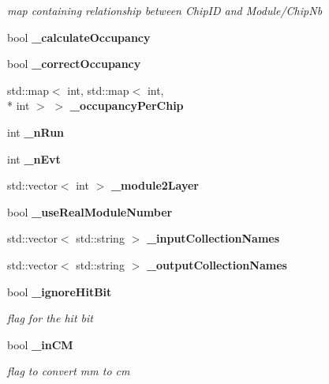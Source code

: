 \begin{DoxyCompactItemize}
\begin{DoxyCompactList}\small\item\em map containing relationship between Chip\-I\-D and Module/\-Chip\-Nb \end{DoxyCompactList}\item 
bool {\bfseries \-\_\-calculate\-Occupancy}\label{classCALICE_1_1Ahc2CalibrateProcessor_a8fc64538e07b1c5f42df362426007387}

\item 
bool {\bfseries \-\_\-correct\-Occupancy}\label{classCALICE_1_1Ahc2CalibrateProcessor_a62acc67ca6e334fdfdd477d444b17efe}

\item 
std\-::map$<$ int, std\-::map$<$ int, \\*
int $>$ $>$ {\bfseries \-\_\-occupancy\-Per\-Chip}\label{classCALICE_1_1Ahc2CalibrateProcessor_a7cc3d7822df8b0b386bdc0f0337cf95f}

\item 
int {\bfseries \-\_\-n\-Run}\label{classCALICE_1_1Ahc2CalibrateProcessor_abeebc6f169ea1548cd38e9405ea245cc}

\item 
int {\bfseries \-\_\-n\-Evt}\label{classCALICE_1_1Ahc2CalibrateProcessor_a81421e874b7f76b0fd09140df26310bd}

\item 
std\-::vector$<$ int $>$ {\bfseries \-\_\-module2\-Layer}\label{classCALICE_1_1Ahc2CalibrateProcessor_a4b5f551ec55b0c161dca109aba9898fc}

\item 
bool {\bfseries \-\_\-use\-Real\-Module\-Number}\label{classCALICE_1_1Ahc2CalibrateProcessor_a5a5f7a19959b43293781fa02469188b3}

\item 
std\-::vector$<$ std\-::string $>$ {\bfseries \-\_\-input\-Collection\-Names}\label{classCALICE_1_1Ahc2CalibrateProcessor_aa621f37c949aeb4e846960c8999c9e97}

\item 
std\-::vector$<$ std\-::string $>$ {\bfseries \-\_\-output\-Collection\-Names}\label{classCALICE_1_1Ahc2CalibrateProcessor_a88e442fd6b305342fa36e7ee5995ae8d}

\item 
bool {\bf \-\_\-ignore\-Hit\-Bit}\label{classCALICE_1_1Ahc2CalibrateProcessor_ae7528e4f54c09999911b7c6ac8552911}

\begin{DoxyCompactList}\small\item\em flag for the hit bit \end{DoxyCompactList}\item 
bool {\bf \-\_\-in\-C\-M}\label{classCALICE_1_1Ahc2CalibrateProcessor_a8618b53237fa25e3ea27f0ebbebe6d38}

\begin{DoxyCompactList}\small\item\em flag to convert mm to cm \end{DoxyCompactList}\end{DoxyCompactItemize}


